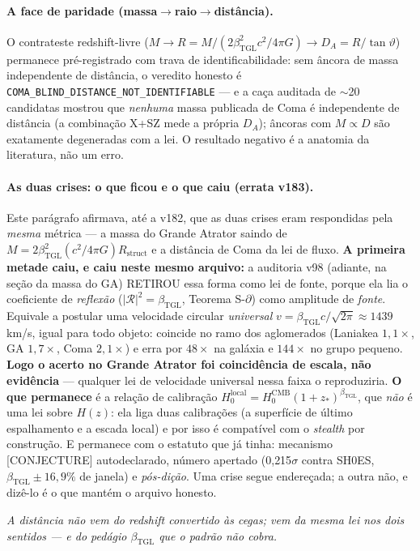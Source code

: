 \documentclass[11pt]{article}
\newcommand{\bTGL}{\beta_{\mathrm{TGL}}}\newcommand{\Msun}{M_{\odot}}\newcommand{\TGL}{\mathrm{TGL}}
\theoremstyle{definition}\newtheorem{deriv}{Derivação}
\begin{document}
\paragraph{A face de paridade (massa$\to$raio$\to$distância).} O contrateste redshift-livre ($M\to R=M/(2\bTGL^2 c^2/4\pi G)\to D_A=R/\tan\vartheta$) permanece pré-registrado com trava de identificabilidade: sem âncora de massa independente de distância, o veredito honesto é \texttt{COMA\_BLIND\_DISTANCE\_NOT\_IDENTIFIABLE} --- e a caça auditada de $\sim$20 candidatas mostrou que \emph{nenhuma} massa publicada de Coma é independente de distância (a combinação X+SZ mede a própria $D_A$); âncoras com $M\propto D$ são exatamente degeneradas com a lei. O resultado negativo é a anatomia da literatura, não um erro.

\paragraph{As duas crises: o que ficou e o que caiu (errata v183).} Este parágrafo afirmava, até a v182, que as duas crises eram respondidas pela \emph{mesma} métrica --- a massa do Grande Atrator saindo de $M=2\bTGL^2(c^2/4\pi G)R_{\mathrm{struct}}$ e a distância de Coma da lei de fluxo. \textbf{A primeira metade caiu, e caiu neste mesmo arquivo:} a auditoria v98 (adiante, na seção da massa do GA) RETIROU essa forma como lei de fonte, porque ela lia o coeficiente de \emph{reflexão} ($|\mathcal{R}|^2=\bTGL$, Teorema S-$\partial$) como amplitude de \emph{fonte}. Equivale a postular uma velocidade circular \emph{universal} $v=\bTGL c/\sqrt{2\pi}\approx 1439$ km/s, igual para todo objeto: coincide no ramo dos aglomerados (Laniakea $1{,}1\times$, GA $1{,}7\times$, Coma $2{,}1\times$) e erra por $48\times$ na galáxia e $144\times$ no grupo pequeno. \textbf{Logo o acerto no Grande Atrator foi coincidência de escala, não evidência} --- qualquer lei de velocidade universal nessa faixa o reproduziria. \textbf{O que permanece} é a relação de calibração $H_0^{\mathrm{local}}=H_0^{\mathrm{CMB}}(1+z_*)^{\bTGL}$, que \emph{não} é uma lei sobre $H(z)$: ela liga duas calibrações (a superfície de último espalhamento e a escada local) e por isso é compatível com o \emph{stealth} por construção. E permanece com o estatuto que já tinha: mecanismo \textsf{[CONJECTURE]} autodeclarado, número apertado (0{,}215$\sigma$ contra SH0ES, $\bTGL\pm16{,}9\%$ de janela) e \emph{pós-dição}. Uma crise segue endereçada; a outra não, e dizê-lo é o que mantém o arquivo honesto.

\emph{A distância não vem do redshift convertido às cegas; vem da mesma lei nos dois sentidos --- e do pedágio $\bTGL$ que o padrão não cobra.}
\end{document}
